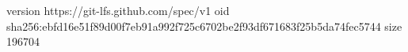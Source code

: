 version https://git-lfs.github.com/spec/v1
oid sha256:ebfd16e51f89d00f7eb91a992f725c6702be2f93df671683f25b5da74fec5744
size 196704
